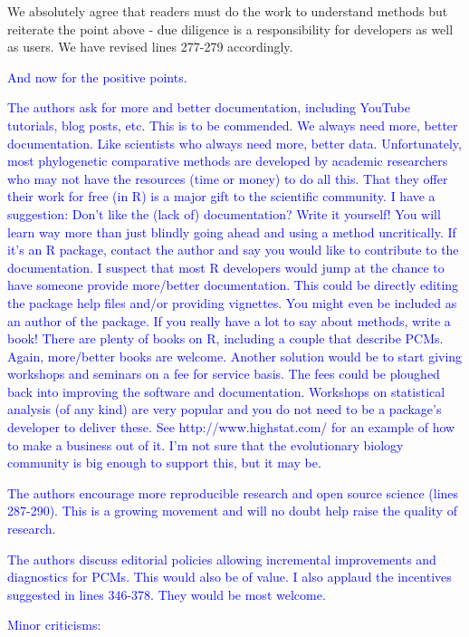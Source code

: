 \documentclass[12pt]{letter}
\begin{document}
\begin{letter}{}
We absolutely agree that readers must do the work to understand methods but reiterate the point above - due diligence is a responsibility for developers as well as users. We have revised lines 277-279 accordingly.

\textcolor{blue}{And now for the positive points.}

\textcolor{blue}{The authors ask for more and better documentation, including YouTube tutorials, blog posts, etc. This is to be commended. We always need more, better documentation. Like scientists who always need more, better data. Unfortunately, most phylogenetic comparative methods are developed by academic researchers who may not have the resources (time or money) to do all this. That they offer their work for free (in R) is a major gift to the scientific community. I have a suggestion: Don't like the (lack of) documentation? Write it yourself! You will learn way more than just blindly going ahead and using a method uncritically. If it's an R package, contact the author and say you would like to contribute to the documentation. I suspect that most R developers would jump at the chance to have someone provide more/better documentation. This could be directly editing the package help files and/or providing vignettes. You  might even be included as an author of the package. If you really have a lot to say about methods, write a book! There are plenty of books on R, including a couple that describe PCMs. Again, more/better books are welcome. Another solution would be to start giving workshops and seminars on a fee for service basis. The fees could be ploughed back into improving the software and documentation. Workshops on statistical analysis (of any kind) are very popular and you do not need to be a package's developer to deliver these. See  http://www.highstat.com/ for an example of how to make a business out of it. I'm not sure that the evolutionary biology community is big enough to support this, but it may be.}

\textcolor{blue}{The authors encourage more reproducible research and open source science (lines 287-290). This is a growing movement and will no doubt help raise the quality of research.}

\textcolor{blue}{The authors discuss editorial policies allowing incremental improvements and diagnostics for PCMs. This would also be of value. I also applaud the incentives suggested in lines 346-378. They would be most welcome.}

\textcolor{blue}{Minor criticisms:}


\end{letter}
\end{document}
